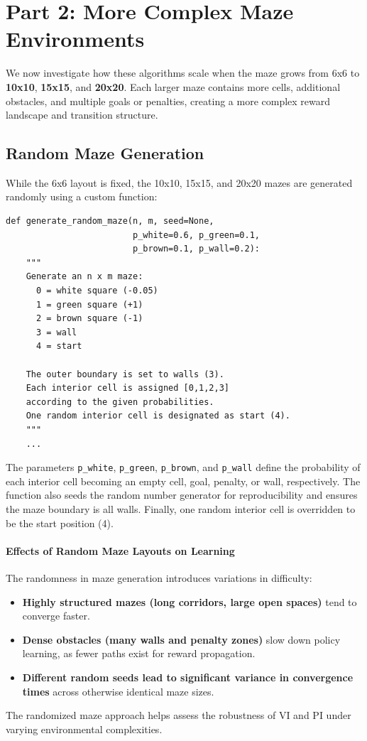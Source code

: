 \documentclass[11pt]{article}
\begin{document}
\newpage
\section{Part 2: More Complex Maze Environments}
\label{sec:part2}
We now investigate how these algorithms scale when the maze grows from 6x6 to \textbf{10x10}, \textbf{15x15}, and \textbf{20x20}. Each larger maze contains more cells, additional obstacles, and multiple goals or penalties, creating a more complex reward landscape and transition structure.

\subsection{Random Maze Generation}
While the 6x6 layout is fixed, the 10x10, 15x15, and 20x20 mazes are generated randomly using a custom function:
\begin{verbatim}
def generate_random_maze(n, m, seed=None, 
                         p_white=0.6, p_green=0.1, 
                         p_brown=0.1, p_wall=0.2):
    """
    Generate an n x m maze:
      0 = white square (-0.05)
      1 = green square (+1)
      2 = brown square (-1)
      3 = wall
      4 = start

    The outer boundary is set to walls (3).
    Each interior cell is assigned [0,1,2,3] 
    according to the given probabilities.
    One random interior cell is designated as start (4).
    """
    ...
\end{verbatim}

\noindent The parameters \verb|p_white|, \verb|p_green|, \verb|p_brown|, and \verb|p_wall| define the probability of each interior cell becoming an empty cell, goal, penalty, or wall, respectively. The function also seeds the random number generator for reproducibility and ensures the maze boundary is all walls. Finally, one random interior cell is overridden to be the start position (4).

\paragraph{Effects of Random Maze Layouts on Learning}
The randomness in maze generation introduces variations in difficulty:
\begin{itemize}
    \item \textbf{Highly structured mazes (long corridors, large open spaces)} tend to converge faster.
    \item \textbf{Dense obstacles (many walls and penalty zones)} slow down policy learning, as fewer paths exist for reward propagation.
    \item \textbf{Different random seeds lead to significant variance in convergence times} across otherwise identical maze sizes.
\end{itemize}
The randomized maze approach helps assess the robustness of VI and PI under varying environmental complexities.
\end{document}
